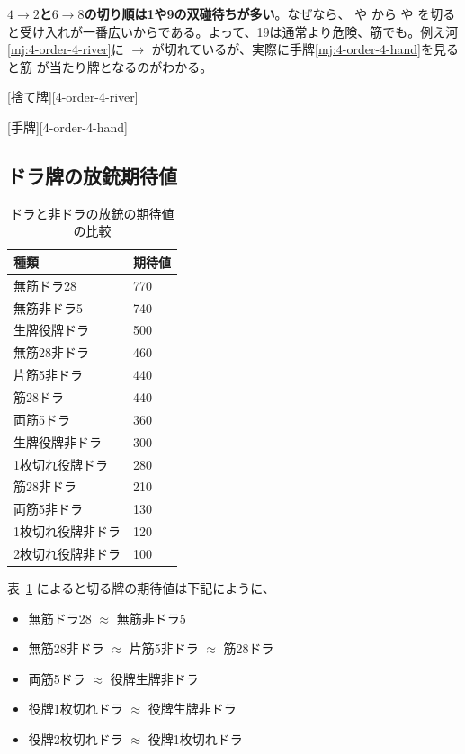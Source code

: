 \documentclass[10pt, twocolumn]{article}
\begin{document}
\textbf{$4\to2$と$6\to8$の切り順は1や9の双碰待ちが多い}\citep[][pp.~95--96]{takizawa-yomi}。なぜなら、 や  から  や  を切ると受け入れが一番広いからである。よって、19は通常より危険、筋でも。例え河\ref{mj:4-order-4-river}に  $\to$  が切れているが、実際に手牌\ref{mj:4-order-4-hand}を見ると筋  が当たり牌となるのがわかる。

[捨て牌][4-order-4-river]

[手牌][4-order-4-hand]


\subsection{ドラ牌の放銃期待値}

\begin{table}[ht]
  \centering
  \begin{tabular}{l|l}
    種類 & 期待値 \\
    \hline
    無筋ドラ28 & 770 \\
    無筋非ドラ5 & 740 \\
    生牌役牌ドラ & 500 \\
    無筋28非ドラ & 460 \\
    片筋5非ドラ & 440 \\
    筋28ドラ & 440 \\
    両筋5ドラ & 360 \\
    生牌役牌非ドラ & 300 \\
    1枚切れ役牌ドラ & 280 \\
    筋28非ドラ & 210 \\
    両筋5非ドラ & 130 \\
    1枚切れ役牌非ドラ & 120 \\
    2枚切れ役牌非ドラ & 100 \\
    \end{tabular}
  \caption{ドラと非ドラの放銃の期待値の比較\citep[][p. 181]{miinin-stat}}
  \label{tab:cut-dora}
\end{table}

表~\ref{tab:cut-dora} によると切る牌の期待値は下記にように、

\begin{itemize}
\item 無筋ドラ28 $\approx$ 無筋非ドラ5
\item 無筋28非ドラ $\approx$ 片筋5非ドラ $\approx$ 筋28ドラ
\item 両筋5ドラ $\approx$ 役牌生牌非ドラ
\item 役牌1枚切れドラ $\approx$ 役牌生牌非ドラ
\item 役牌2枚切れドラ $\approx$ 役牌1枚切れドラ
\end{itemize}
\end{document}
